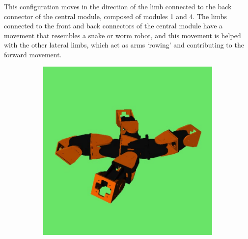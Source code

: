 This configuration moves in the direction of the limb connected to the back connector of the central module, composed of modules 1 and 4. The limbs connected to the front and back connectors of the central module have a movement that resembles a snake or worm robot, and this movement is helped with the other lateral limbs, which act as arms `rowing' and contributing to the forward movement.\\

\begin{figure}[h]
		\centering
        \begin{subfigure}[b]{0.18\textwidth}
                \centering
                \includegraphics[width=\textwidth]{images/results_9_gait_01.png}
                 \\~
        \end{subfigure}
        ~
        \begin{subfigure}[b]{0.18\textwidth}
                \centering

\end{subfigure}
\end{figure}
